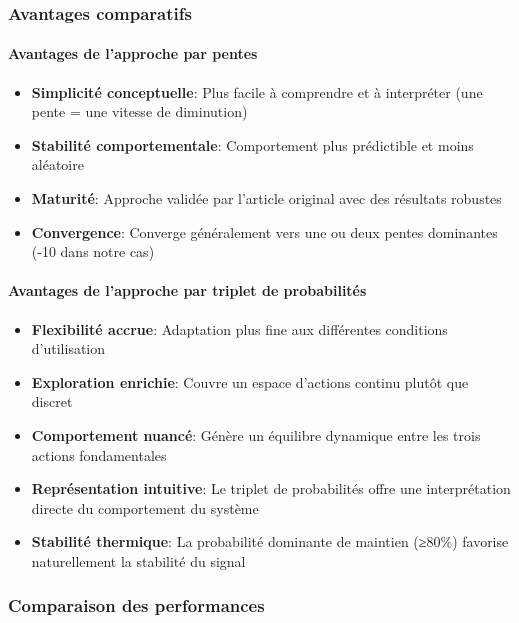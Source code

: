 \subsubsection{Avantages comparatifs}

\paragraph{Avantages de l'approche par pentes}
\begin{itemize}
    \item \textbf{Simplicité conceptuelle}: Plus facile à comprendre et à interpréter (une pente = une vitesse de diminution)
    \item \textbf{Stabilité comportementale}: Comportement plus prédictible et moins aléatoire
    \item \textbf{Maturité}: Approche validée par l'article original avec des résultats robustes
    \item \textbf{Convergence}: Converge généralement vers une ou deux pentes dominantes (-10 dans notre cas)
\end{itemize}

\paragraph{Avantages de l'approche par triplet de probabilités}
\begin{itemize}
    \item \textbf{Flexibilité accrue}: Adaptation plus fine aux différentes conditions d'utilisation
    \item \textbf{Exploration enrichie}: Couvre un espace d'actions continu plutôt que discret
    \item \textbf{Comportement nuancé}: Génère un équilibre dynamique entre les trois actions fondamentales
    \item \textbf{Représentation intuitive}: Le triplet de probabilités offre une interprétation directe du comportement du système
    \item \textbf{Stabilité thermique}: La probabilité dominante de maintien (≥80\%) favorise naturellement la stabilité du signal
\end{itemize}

\subsubsection{Comparaison des performances}

